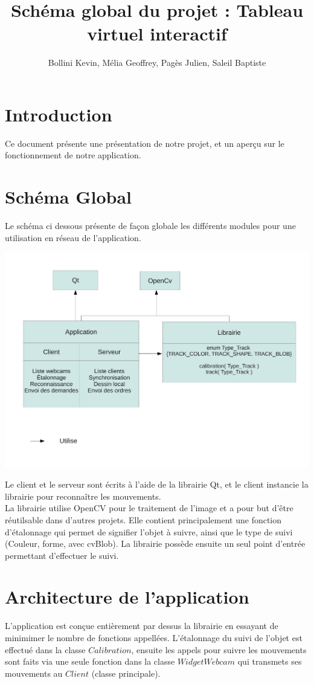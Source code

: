 \documentclass{article}
\title{Schéma global du projet : Tableau virtuel interactif}
\author{Bollini Kevin, Mélia Geoffrey, Pagès Julien, Saleil Baptiste}
\begin{document}
\maketitle

\section{Introduction}
Ce document présente une présentation de notre projet, et un aperçu sur le fonctionnement de notre application.

\section{Schéma Global}
Le schéma ci dessous présente de façon globale les différents modules pour une utilisation en réseau de l'application.
	\begin{center}
	\includegraphics[scale=0.5]{schema_global.pdf}
	\end{center}
Le client et le serveur sont écrits à l'aide de la librairie Qt, et le client instancie la librairie pour reconnaître les mouvements. \\
La librairie utilise OpenCV pour le traitement de l'image et a pour but d'être réutilsable dans d'autres projets. 
Elle contient principalement une fonction d'étalonnage qui permet de signifier l'objet à suivre, ainsi que le type de suivi (Couleur, forme, avec cvBlob). La librairie possède ensuite un seul point d'entrée permettant d'effectuer le suivi.

\newpage
\section{Architecture de l'application}
L'application est conçue entièrement par dessus la librairie en essayant de minimimer le nombre de fonctions appellées. 
L'étalonnage du suivi de l'objet est effectué dans la classe $Calibration$, ensuite les appels pour suivre les mouvements sont faits
via une seule fonction dans la classe $WidgetWebcam$ qui transmets ses mouvements au $Client$ (classe principale). \\
\end{document}
